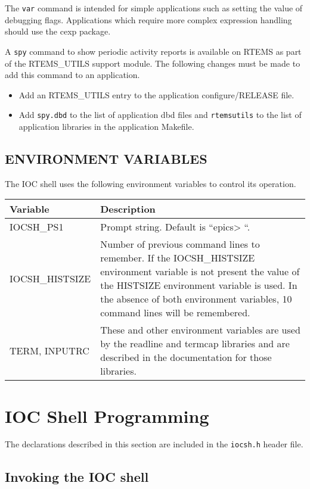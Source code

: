 The \verb|var| command is intended for simple applications such as setting the value of debugging flags.  Applications which 
require more complex expression handling should use the cexp package.

A \verb|spy| command to show periodic activity reports is available on RTEMS as part of the RTEMS\_UTILS support module.  
The following changes must be made to add this command to an application.

\begin{itemize}\item Add an RTEMS\_UTILS entry to the application configure/RELEASE file.

\item Add \verb|spy.dbd| to the list of application dbd files and \verb|rtemsutils| to the list of application libraries in the 
application Makefile.

\end{itemize}\subsection{ENVIRONMENT VARIABLES}

The IOC shell uses the following environment variables to control its operation.
\begin{center}\begin{longtable}{p{1.305in}p{5.46in}}
Variable & Description\\
\hline
IOCSH\_PS1 & Prompt string. Default is ``epics\textgreater{} ``.\\
IOCSH\_HISTSIZE & Number of previous command lines to remember. If the IOCSH\_HISTSIZE environment variable is not present the value of the HISTSIZE environment variable is used.  In the absence of both environment variables, 10 command lines will be remembered.\\
TERM, INPUTRC & These and other environment variables are used by the readline and termcap libraries and are described in the documentation for those libraries.
\end{longtable}\end{center}


\section{IOC Shell Programming}

The declarations described in this section are included in the \verb|iocsh.h| header file.

\subsection{Invoking the IOC shell}

